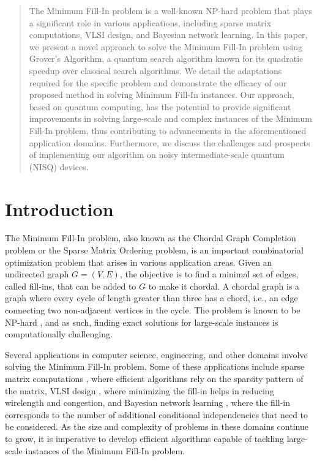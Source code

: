 \begin{abstract}
The Minimum Fill-In problem is a well-known NP-hard problem that plays a significant role in various applications, including sparse matrix computations, VLSI design, and Bayesian network learning. In this paper, we present a novel approach to solve the Minimum Fill-In problem using Grover's Algorithm, a quantum search algorithm known for its quadratic speedup over classical search algorithms. We detail the adaptations required for the specific problem and demonstrate the efficacy of our proposed method in solving Minimum Fill-In instances. Our approach, based on quantum computing, has the potential to provide significant improvements in solving large-scale and complex instances of the Minimum Fill-In problem, thus contributing to advancements in the aforementioned application domains. Furthermore, we discuss the challenges and prospects of implementing our algorithm on noisy intermediate-scale quantum (NISQ) devices.
\end{abstract}

\section{Introduction}

The Minimum Fill-In problem, also known as the Chordal Graph Completion problem or the Sparse Matrix Ordering problem, is an important combinatorial optimization problem that arises in various application areas. Given an undirected graph $G = (V, E)$, the objective is to find a minimal set of edges, called fill-ins, that can be added to $G$ to make it chordal. A chordal graph is a graph where every cycle of length greater than three has a chord, i.e., an edge connecting two non-adjacent vertices in the cycle. The problem is known to be NP-hard \cite{yannakakis1981computing}, and as such, finding exact solutions for large-scale instances is computationally challenging.

Several applications in computer science, engineering, and other domains involve solving the Minimum Fill-In problem. Some of these applications include sparse matrix computations \cite{rose1972graph}, where efficient algorithms rely on the sparsity pattern of the matrix, VLSI design \cite{lengauer1990combinatorial}, where minimizing the fill-in helps in reducing wirelength and congestion, and Bayesian network learning \cite{heckerman1995learning}, where the fill-in corresponds to the number of additional conditional independencies that need to be considered. As the size and complexity of problems in these domains continue to grow, it is imperative to develop efficient algorithms capable of tackling large-scale instances of the Minimum Fill-In problem.

